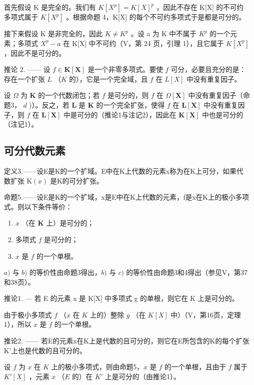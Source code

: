 首先假设 K 是完全的。我们有 \(K[X^{p}] = K[X]^{p}\) ，因此不存在 K{[}X{]} 的不可约多项式属于 \(K[X^{p}]\) 。根据命题 4，K{[}X{]} 的每个不可约多项式于是都是可分的。

接下来假设 K 是非完全的，因此 \(K \neq K^{p}\) 。设 a 为 K 中不属于 \(K^{p}\) 的一个元素；多项式 \(X^{p} - a\) 在 K{[}X{]} 中不可约（V，第 24 页，引理 1），且它属于 \(K[X^{p}]\) ，因此不是可分的。

推论 2. —— 设 \(f \in \mathbf{K}[\mathbf{X}]\) 是一个非零多项式。要使 \(f\) 可分，必要且充分的是：存在一个扩张 \(L\) （\(K\) 的），它是一个完全域，且 \(f\) 在 \(L[X]\) 中没有重复因子。

设 \(\Omega\) 为 \(\mathbf{K}\) 的一个代数闭包；若 \(f\) 是可分的，则 \(f\) 在 \(\Omega[\mathbf{X}]\) 中没有重复因子（命题3， \(d\) )）。反之，若 \(\mathbf{L}\) 是 \(\mathbf{K}\) 的一个完全扩张，使得 \(f\) 在 \(\mathbf{L}[\mathbf{X}]\) 中没有重复因子，则 \(f\) 在 \(\mathbf{L}[\mathbf{X}]\) 中是可分的（推论1与注记2），因此在 \(\mathbf{K}[\mathbf{X}]\) 中也是可分的（注记1）。

\subsection{可分代数元素}

定义3.——设E是K的一个扩域。E中在K上代数的元素x称为在K上可分，如果代数扩张 \(\mathrm{K}(x)\) 是K的可分扩张。

命题5.——设E是K的一个扩域，x是E中在K上代数的元素，f是x在K上的极小多项式。则以下条件等价：

\begin{enumerate}
\def\labelenumi{\alph{enumi})}
\item
  \(x\) （在 \(\mathbf{K}\) 上）是可分的；
\item
  多项式 \(f\) 是可分的；
\item
  \(x\) 是 \(f\) 的一个单根。
\end{enumerate}

\(a)\) 与 \(b)\) 的等价性由命题3得出，\(b)\) 与 \(c)\) 的等价性由命题3和4得出（参见V，第37和38页）。

推论1. --- 若 E 的元素 x 是 K{[}X{]} 中多项式 g 的单根，则它在 K 上是可分的。

由于极小多项式 \(f\) （\(x\) 在 \(K\) 上的）整除 \(g\) （在 \(K[X]\) 中）（V，第16页，定理1），所以 \(x\) 是 \(f\) 的一个单根。

推论2. —— 若E的元素x在K上是代数的且可分的，则它在E所包含的K的每个扩张K'上也是代数的且可分的。

设 \(f\) 为 \(x\) 在 \(K\) 上的极小多项式，则由命题5，\(x\) 是 \(f\) 的一个单根，且由于 \(f\) 属于 \(K'[X]\) ，元素 \(x\) （\(E\) 的）在 \(K'\) 上是可分的（由推论1）。

